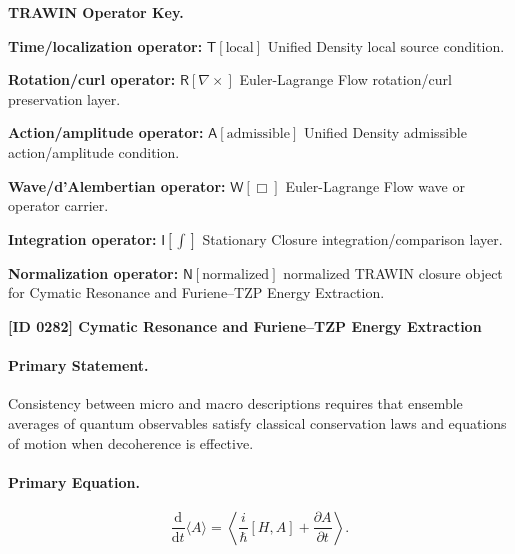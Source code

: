 \par\vspace{0.45\baselineskip}
\noindent\begin{minipage}[t]{\linewidth}
\begingroup
\small
\raggedright
\textbf{TRAWIN Operator Key.}\par
\noindent\textbf{Time/localization operator:} $\mathsf{T}\!\left[\mathrm{local}\right]$ Unified Density local source condition.\par
\noindent\textbf{Rotation/curl operator:} $\mathsf{R}\!\left[\nabla\times\right]$ Euler-Lagrange Flow rotation/curl preservation layer.\par
\noindent\textbf{Action/amplitude operator:} $\mathsf{A}\!\left[\mathrm{admissible}\right]$ Unified Density admissible action/amplitude condition.\par
\noindent\textbf{Wave/d'Alembertian operator:} $\mathsf{W}\!\left[\Box\right]$ Euler-Lagrange Flow wave or operator carrier.\par
\noindent\textbf{Integration operator:} $\mathsf{I}\!\left[\int\right]$ Stationary Closure integration/comparison layer.\par
\noindent\textbf{Normalization operator:} $\mathsf{N}\!\left[\mathrm{normalized}\right]$ normalized TRAWIN closure object for Cymatic Resonance and Furiene--TZP Energy Extraction.\par
\endgroup
\end{minipage}

\clearpage
\noindent\textbf{[ID 0282] Cymatic Resonance and Furiene--TZP Energy Extraction}\par
\vspace{0.35em}
\paragraph{Primary Statement.}
Consistency between micro and macro descriptions requires that ensemble averages of quantum observables satisfy classical conservation laws and equations of motion when decoherence is effective.

\paragraph{Primary Equation.}
\begin{equation}
\frac{\mathrm{d}}{\mathrm{d}t}\langle A\rangle
=
\left\langle
\frac{i}{\hbar}[H,A]
+
\frac{\partial A}{\partial t}
\right\rangle .
\end{equation}

